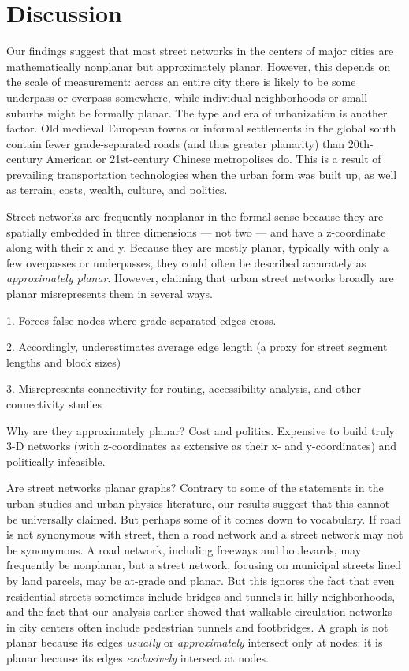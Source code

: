 \documentclass[Afour,sageh,times]{sagej}
\begin{document}
\section{Discussion}

Our findings suggest that most street networks in the centers of major cities are mathematically nonplanar but approximately planar. However, this depends on the scale of measurement: across an entire city there is likely to be some underpass or overpass somewhere, while individual neighborhoods or small suburbs might be formally planar. The type and era of urbanization is another factor. Old medieval European towns or informal settlements in the global south contain fewer grade-separated roads (and thus greater planarity) than 20th-century American or 21st-century Chinese metropolises do. This is a result of prevailing transportation technologies when the urban form was built up, as well as terrain, costs, wealth, culture, and politics.

Street networks are frequently nonplanar in the formal sense because they are spatially embedded in three dimensions --- not two --- and have a z-coordinate along with their x and y. Because they are mostly planar, typically with only a few overpasses or underpasses, they could often be described accurately as \emph{approximately planar}. However, claiming that urban street networks broadly are planar misrepresents them in several ways.

1. Forces false nodes where grade-separated edges cross.

2. Accordingly, underestimates average edge length (a proxy for street segment lengths and block sizes)

3. Misrepresents connectivity for routing, accessibility analysis, and other connectivity studies

Why are they approximately planar? Cost and politics. Expensive to build truly 3-D networks (with z-coordinates as extensive as their x- and y-coordinates) and politically infeasible.

Are street networks planar graphs? Contrary to some of the statements in the urban studies and urban physics literature, our results suggest that this cannot be universally claimed. But perhaps some of it comes down to vocabulary. If road is not synonymous with street, then a road network and a street network may not be synonymous. A road network, including freeways and boulevards, may frequently be nonplanar, but a street network, focusing on municipal streets lined by land parcels, may be at-grade and planar. But this ignores the fact that even residential streets sometimes include bridges and tunnels in hilly neighborhoods, and the fact that our analysis earlier showed that walkable circulation networks in city centers often include pedestrian tunnels and footbridges. A graph is not planar because its edges \emph{usually} or \emph{approximately} intersect only at nodes: it is planar because its edges \emph{exclusively} intersect at nodes.
\end{document}
